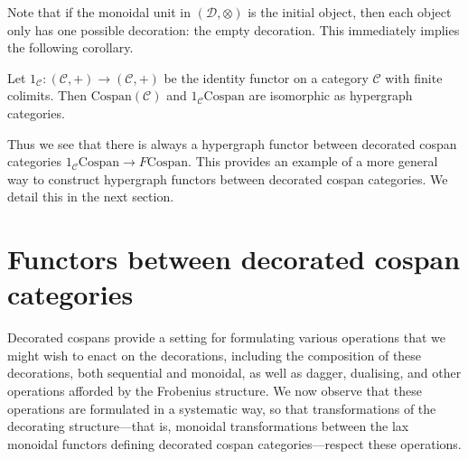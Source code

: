 Note that if the monoidal unit in $(\mathcal D,\otimes)$ is the initial object,
then each object only has one possible decoration: the empty decoration. This
immediately implies the following corollary.
\begin{corollary}
  Let $1_{\mathcal C}\colon (\mathcal C,+) \to (\mathcal C,+)$ be the identity functor
  on a category $\mathcal C$ with finite colimits. Then
  $\mathrm{Cospan}(\mathcal C)$ and $1_{\mathcal C}\mathrm{Cospan}$ are
  isomorphic as hypergraph categories.
\end{corollary}

Thus we see that there is always a hypergraph functor between decorated cospan
categories $1_{\mathcal C}\mathrm{Cospan} \rightarrow F\mathrm{Cospan}$. This
provides an example of a more general way to construct hypergraph functors
between decorated cospan categories. We detail this in the next section.

\section{Functors between decorated cospan categories} \label{sec:dcf}

Decorated cospans provide a setting for formulating various operations that we
might wish to enact on the decorations, including the composition of these
decorations, both sequential and monoidal, as well as dagger, dualising, and
other operations afforded by the Frobenius structure. We now observe that these
operations are formulated in a systematic way, so that transformations of the
decorating structure---that is, monoidal transformations between the lax
monoidal functors defining decorated cospan categories---respect these
operations. 

